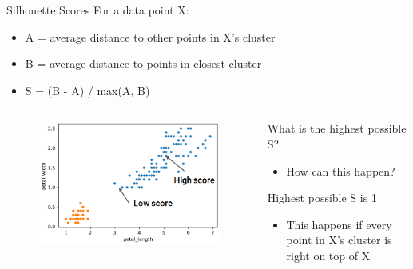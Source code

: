 \documentclass[aspectratio=169]{../latex_main/tntbeamer}  %
\begin{document}
	
	
	\begin{frame}{Silhouette Scores}
	    For a data point X:
	    \begin{itemize}
	        \item A = average distance to other points in X’s cluster 
	        \item B = average distance to points in closest cluster
	        \item S = (B - A) / max(A, B)
	    \end{itemize}
	    \begin{columns}
	        \begin{column}{.5\textwidth}
	                \begin{figure}
	                    \centering
	                    \includegraphics[scale=.35]{Bild57}
	                \end{figure}
	        \end{column}
	        
	        
	        \begin{column}{.5\textwidth}
	                What is the highest possible S?
	                \begin{itemize}
	                    \item How can this happen?
	                \end{itemize}
	                \pause
	                Highest possible S is 1
	                \begin{itemize}
	                    \item This happens if every point in X’s cluster is right on top of X
	                \end{itemize}
	        \end{column}
	        
	        
	    \end{columns}
	\end{frame}
	
\end{document}
